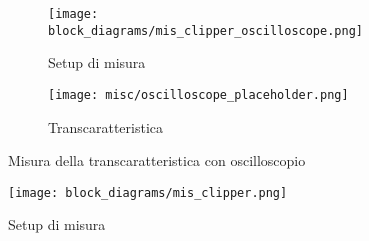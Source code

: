 \begin{figure}[H]
    \centering

    \begin{subfigure}{.5\textwidth}
        \centering
        \texttt{[image: block\_diagrams/mis\_clipper\_oscilloscope.png]}
        \caption{Setup di misura}
        \label{mis_clipper_oscilloscope}
    \end{subfigure}%
    \begin{subfigure}{.5\textwidth}
        \centering
        \texttt{[image: misc/oscilloscope\_placeholder.png]}
        \caption{Transcaratteristica}
        \label{clipper_transcharacteristic}
    \end{subfigure}

    \caption{Misura della transcaratteristica con oscilloscopio}
\end{figure}

\begin{figure}[H]
    \centering
    \texttt{[image: block\_diagrams/mis\_clipper.png]}
    \caption{Setup di misura}
    \label{mis_clipper}
\end{figure}

